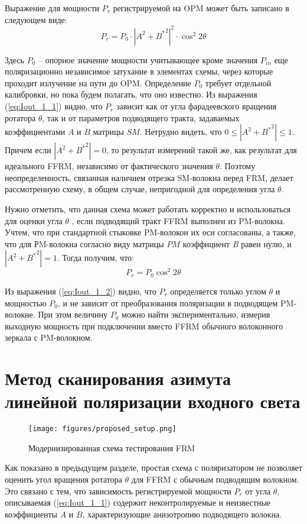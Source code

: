 \documentclass{article}
\begin{document}
Выражение для мощности $P_r$ регистрируемой на OPM может быть записано в следующем виде:
\begin{equation}
	\label{eq:Iout_1_1}
	P_{r} = P_0 \cdot \left| A^2 + {B^*}^2 \right|^2 \cdot \cos^2 2 \theta
\end{equation}

Здесь $P_0$ – опорное значение мощности учитывающее кроме значения $P_{in}$ еще поляризационно независимое затухание в элементах схемы, через которые проходит излучение на пути до OPM.
Определение $P_0$ требует отдельной калибровки, но пока будем полагать, что оно известно.
Из выражения (\ref{eq:Iout_1_1}) видно, что $P_{r}$ зависит как от угла фарадеевского вращения ротатора $\theta$, так и от параметров подводящего тракта, задаваемых коэффициентами $A$ и $B$ матрицы $SM$.
Нетрудно видеть, что  $0\le\left| A^2 + {B^*}^2 \right|\le1$.
Причем если $\left| A^2 + {B^*}^2 \right|=0$, то результат измерений такой же, как результат для идеального FFRM, независимо от фактического значения  $\theta$.
Поэтому неопределенность, связанная наличием отрезка SM-волокна перед FRM, делает рассмотренную схему, в общем случае, непригодной для определения угла $\theta$.

Нужно отметить, что данная схема может работать корректно и использоваться для оценки  угла $\theta$ , если подводящий тракт FFRM выполнен из PM-волокна.
Учтем, что при стандартной стыковке PM-волокон их оси согласованы, а также, что для РM-волокна согласно виду матрицы $PM$ коэффициент \textit{B} равен нулю, и $\left| A^2 + {B^*}^2 \right| = 1$.
Тогда получим, что: 
\begin{equation}
	\label{eq:Iout_1_2}
	P_{r} =  P_0 \cos^2 2 \theta 
\end{equation}

Из выражения (\ref{eq:Iout_1_2}) видно, что $P_{r}$ определяется только углом  $\theta$ и мощностью $P_0$, и не зависит от преобразования поляризации в подводящем PM-волокне.
При этом величину $P_0$ можно найти экспериментально, измерив выходную мощность при подключении вместо FFRM обычного волоконного зеркала с PM-волокном.


\section{Метод сканирования азимута линейной поляризации входного света}
\begin{figure}[b]
	\centering
	\texttt{[image: figures/proposed\_setup.png]}
	\caption{Модернизированная схема тестирования FRM}
	\label{fig:proposed_setup}
\end{figure} 
Как показано в предыдущем разделе, простая схема с поляризатором не позволяет оценить угол вращения ротатора $\theta$ для FFRM с обычным подводящим волокном. 
Это связано с тем, что зависимость регистрируемой мощности $P_r$ от угла $\theta$, описываемая (\ref{eq:Iout_1_1}) содержит неконтролируемые и неизвестные коэффициенты $A$ и $B$, характеризующие анизотропию подводящего волокна.
\end{document}
